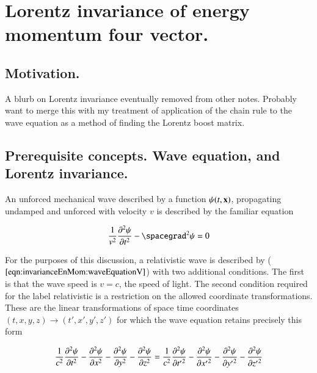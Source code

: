 \chapter{Lorentz invariance of energy momentum four vector.}
\label{chap:invarianceEnMom}

\section{Motivation.}

A blurb on Lorentz invariance eventually removed from other notes.
Probably want to merge this with my treatment of application of the
chain rule to the wave equation as a method of
finding the Lorentz boost matrix.

\section{Prerequisite concepts.  Wave equation, and Lorentz invariance.}

An unforced mechanical wave described by a function $\psi(t,\mathbf{x})$, propagating undamped and unforced with
velocity $v$ is described by the familiar equation

\begin{align}\label{eqn:invarianceEnMom:waveEquationV}
\inv{v^2} \frac{\partial^2 \psi}{\partial t^2} - \spacegrad^2 \psi = 0
\end{align}

For the purposes of this discussion, a relativistic wave is described by ($\ref{eqn:invarianceEnMom:waveEquationV}$) with two
additional conditions.  The first is that the wave speed is
$v = c$, the speed of light.  The second condition required for the label relativistic 
is a restriction on the allowed coordinate transformations.  These are the linear transformations
of space time coordinates
$(t,x,y,z) \rightarrow (t', x', y', z')$ for which the wave equation retains precisely this form

\begin{align}\label{eqn:invarianceEnMom:waveEquationInv}
\frac{1}{c^2} \frac{\partial^2 \psi}{\partial {t}^2} 
- \frac{\partial^2 \psi}{\partial {x}^2} 
- \frac{\partial^2 \psi}{\partial {y}^2} 
- \frac{\partial^2 \psi}{\partial {z}^2} 
=
\frac{1}{c^2} \frac{\partial^2 \psi}{\partial {t'}^2} 
- \frac{\partial^2 \psi}{\partial {x'}^2} 
- \frac{\partial^2 \psi}{\partial {y'}^2} 
- \frac{\partial^2 \psi}{\partial {z'}^2} 
\end{align}

